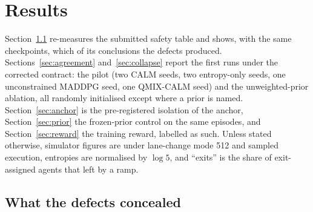 \section{Results}
\label{sec:results}

Section~\ref{sec:concealed} re-measures the submitted safety table and shows, with the same checkpoints, which of its conclusions the defects produced. Sections~\ref{sec:agreement} and~\ref{sec:collapse} report the first runs under the corrected contract: the pilot (two CALM seeds, two entropy-only seeds, one unconstrained MADDPG seed, one QMIX-CALM seed) and the unweighted-prior ablation, all randomly initialised except where a prior is named. Section~\ref{sec:anchor} is the pre-registered isolation of the anchor, Section~\ref{sec:prior} the frozen-prior control on the same episodes, and Section~\ref{sec:reward} the training reward, labelled as such. Unless stated otherwise, simulator figures are under lane-change mode 512 and sampled execution, entropies are normalised by $\log 5$, and ``exits'' is the share of exit-assigned agents that left by a ramp.

\subsection{What the defects concealed}
\label{sec:concealed}

